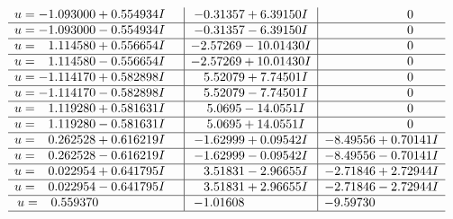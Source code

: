\documentclass[1p]{elsarticle_modified}
\theoremstyle{definition}
\begin{document}
$$\begin{array}{c|c|c}
\begin{aligned}
u &= -1.093000 + 0.554934 I\end{aligned}
 & -0.31357 + 6.39150 I & \phantom{-0.000000 } 0 \\ \hline\begin{aligned}
u &= -1.093000 - 0.554934 I\end{aligned}
 & -0.31357 - 6.39150 I & \phantom{-0.000000 } 0 \\ \hline\begin{aligned}
u &= \phantom{-}1.114580 + 0.556654 I\end{aligned}
 & -2.57269 - 10.01430 I & \phantom{-0.000000 } 0 \\ \hline\begin{aligned}
u &= \phantom{-}1.114580 - 0.556654 I\end{aligned}
 & -2.57269 + 10.01430 I & \phantom{-0.000000 } 0 \\ \hline\begin{aligned}
u &= -1.114170 + 0.582898 I\end{aligned}
 & \phantom{-}5.52079 + 7.74501 I & \phantom{-0.000000 } 0 \\ \hline\begin{aligned}
u &= -1.114170 - 0.582898 I\end{aligned}
 & \phantom{-}5.52079 - 7.74501 I & \phantom{-0.000000 } 0 \\ \hline\begin{aligned}
u &= \phantom{-}1.119280 + 0.581631 I\end{aligned}
 & \phantom{-}5.0695 - 14.0551 I & \phantom{-0.000000 } 0 \\ \hline\begin{aligned}
u &= \phantom{-}1.119280 - 0.581631 I\end{aligned}
 & \phantom{-}5.0695 + 14.0551 I & \phantom{-0.000000 } 0 \\ \hline\begin{aligned}
u &= \phantom{-}0.262528 + 0.616219 I\end{aligned}
 & -1.62999 + 0.09542 I & -8.49556 + 0.70141 I \\ \hline\begin{aligned}
u &= \phantom{-}0.262528 - 0.616219 I\end{aligned}
 & -1.62999 - 0.09542 I & -8.49556 - 0.70141 I \\ \hline\begin{aligned}
u &= \phantom{-}0.022954 + 0.641795 I\end{aligned}
 & \phantom{-}3.51831 - 2.96655 I & -2.71846 + 2.72944 I \\ \hline\begin{aligned}
u &= \phantom{-}0.022954 - 0.641795 I\end{aligned}
 & \phantom{-}3.51831 + 2.96655 I & -2.71846 - 2.72944 I \\ \hline\begin{aligned}
u &= \phantom{-}0.559370\phantom{ +0.000000I}\end{aligned}
 & -1.01608\phantom{ +0.000000I} & -9.59730\phantom{ +0.000000I}\\
 \hline 
 \end{array}$$\newpage
\end{document}
